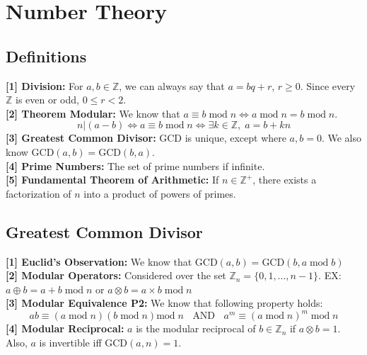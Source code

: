 \section{Number Theory}
\subsection{Definitions}
\textbf{[1] Division:} For $a,b \in \mathbb{Z}$, we can always say that $a = bq + r$, $r \geq 0$. Since every $\mathbb{Z}$ is even or odd, $0\leq r < 2$. \\
\textbf{[2] Theorem Modular:} We know that $a \equiv b\;\text{mod}\;n \iff a\;\text{mod}\;n = b \;\text{mod}\;n$.
$$
n|(a-b) \iff a \equiv b\;\text{mod}\;n \iff \exists k \in \mathbb{Z},\;a = b+kn
$$
\textbf{[3] Greatest Common Divisor:} GCD is unique, except where $a,b = 0$. We also know $\text{GCD}(a,b) = \text{GCD}(b,a)$.\\
\textbf{[4] Prime Numbers:} The set of prime numbers if infinite. \\
\textbf{[5] Fundamental Theorem of Arithmetic:} If $n \in \mathbb{Z}^+$, there exists a factorization of $n$ into a product of powers of primes.
\subsection{Greatest Common Divisor}
\textbf{[1] Euclid's Observation:} We know that $\text{GCD}(a,b) = \text{GCD}(b, a\;\text{mod}\;b)$\\
\textbf{[2] Modular Operators:} Considered over the set $\mathbb{Z}_n = \{0,1,\dots,n-1\}$. EX: $a \oplus b = a + b\;\text{mod}\;n$ or $a \otimes b = a \times b\;\text{mod}\;n$\\
\textbf{[3] Modular Equivalence P2:} We know that following property holds:
$$
ab \equiv (a\;\text{mod}\;n)(b\;\text{mod}\;n)\text{mod}\;n\;\;\text{   AND   }\;\;a^m \equiv (a\;\text{mod}\;n)^m\;\text{mod}\;n
$$
\textbf{[4] Modular Reciprocal:} $a$ is the modular reciprocal of $b \in \mathbb{Z}_n$ if $a \otimes b = 1$. Also, $a$ is invertible iff $\text{GCD}(a,n) = 1$.

